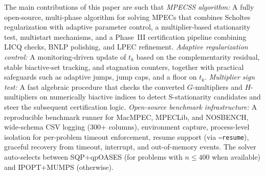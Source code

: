 The main contributions of this paper are such that
\emph{MPECSS algorithm:} A fully open-source, multi-phase
  algorithm for solving MPECs that combines Scholtes regularization with
  adaptive parameter control, a multiplier-based stationarity
  test, multistart mechanisms, and a Phase~III
  certification pipeline combining LICQ checks, BNLP polishing, and
  LPEC refinement.
\emph{Adaptive regularization control:} A monitoring-driven update of
  $t_k$ based on the complementarity residual, stable biactive-set
  tracking, and stagnation counters, together with practical safeguards
  such as adaptive jumps, jump caps, and a floor on $t_k$.
\emph{Multiplier sign test:} A fast algebraic procedure that checks the
  converted $G$-multipliers and $H$-multipliers on numerically biactive indices to
  detect S-stationarity candidates and steer the subsequent
  certification logic.
\emph{Open-source benchmark infrastructure:} A reproducible benchmark
  runner for MacMPEC, MPECLib, and NOSBENCH,
  wide-schema CSV logging (300+ columns),
  environment capture, process-level isolation for per-problem
  timeout enforcement, resume support (via \texttt{--resume}), graceful recovery from timeout, interrupt,
  and out-of-memory events. The solver auto-selects between
  SQP$+$qpOASES (for problems with $n \leq 400$ when available) and
  IPOPT$+$MUMPS (otherwise).


